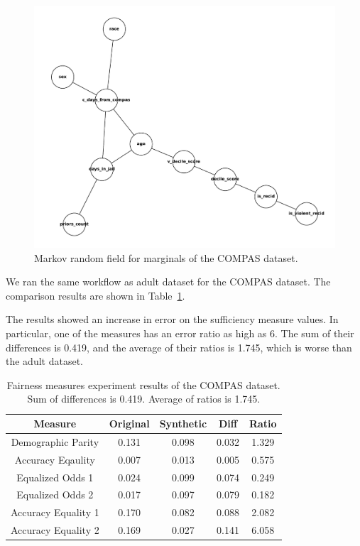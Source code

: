 \documentclass[acmsmall,sigconf]{acmart}
\begin{document}
\begin{figure}[h]
\centering
\includegraphics[width=\linewidth]{compas_mst}
\caption{Markov random field for marginals of the COMPAS dataset.}
\label{fig:compas_mst}
\end{figure}

We ran the same workflow as adult dataset for the COMPAS dataset. The comparison results are shown in Table~\ref{tab:compas_score}.

The results showed an increase in error on the sufficiency measure values. In particular, one of the measures has an error ratio as high as 6. The sum of their differences is 0.419, and the average of their ratios is 1.745, which is worse than the adult dataset.

\begin{table}[h]
\caption{Fairness measures experiment results of the COMPAS dataset. Sum of differences is 0.419. Average of ratios is 1.745.}
\label{tab:compas_score}
\begin{tabular}{ccccc}
\toprule
\textbf{Measure} & \textbf{Original} & \textbf{Synthetic} & \textbf{Diff} & \textbf{Ratio} \\
\midrule
Demographic Parity     & 0.131 & 0.098 & 0.032 & 1.329 \\
Accuracy Eqaulity      & 0.007 & 0.013 & 0.005 & 0.575 \\
Equalized Odds 1       & 0.024 & 0.099 & 0.074 & 0.249 \\
Equalized Odds 2       & 0.017 & 0.097 & 0.079 & 0.182 \\
Accuracy Equality 1    & 0.170 & 0.082 & 0.088 & 2.082 \\
Accuracy Equality 2    & 0.169 & 0.027 & 0.141 & 6.058 \\
\bottomrule
\end{tabular}
\end{table}
\end{document}
